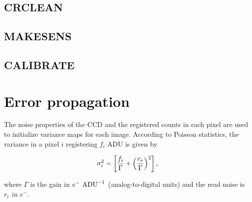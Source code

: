 \documentclass[preprint,11pt]{aastex}
\begin{document}
\subsection{CRCLEAN}

\subsection{MAKESENS}

\subsection{CALIBRATE}

\section{Error propagation}

The noise properties of the CCD and the registered counts in each
pixel are used to initialize variance maps for each image.  According
to Poisson statistics, the variance in a pixel $i$ registering $f_{i}$
ADU is given by

\begin{equation}
\sigma_{i}^{2} = \left[ \frac{f_{i}}{\Gamma} + \left(\frac{r_{\rm
e}}{\Gamma}\right)^{2} \right],
\end{equation}

\noindent where $\Gamma$ is the gain in $e^{-}\ {\rm ADU}^{-1}$
(analog-to-digital units) and the read noise is $r_{e}$ in $e^{-}$.  
\end{document}

